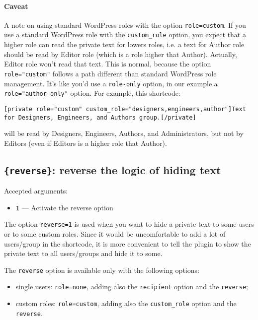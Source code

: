 \paragraph{Caveat}\label{caveat}

A note on using standard WordPress  roles with the option \verb+role=custom+.
If you use a standard WordPress role with the \verb+custom_role+ option, you
expect that a higher role can read the private text for lowers roles, i.e. a
text for Author role should be read by Editor role (which is a role higher that
Author). Actually, Editor role won't read that text. This is normal, because the
option \verb+role="custom"+ follows a path different than standard WordPress
role management. It's like you'd use a \verb+role-only+ option, in our example a
\verb+role="author-only"+ option. For example, this shortcode:

\begin{lstlisting}
[private role="custom" custom_role="designers,engineers,author"]Text for Designers, Engineers, and Authors group.[/private]
\end{lstlisting}

will be read by Designers, Engineers, Authors, and Administrators, but not by
Editors (even if Editors is a higher role that Author).

\subsection{\texttt{\{reverse\}}: reverse the logic of hiding text}

Accepted arguments:

\begin{itemize}
 \item \verb+1+ --- Activate the reverse option
\end{itemize}

The option \verb+reverse=1+ is used when you want to hide a private text to some
users or to some custom roles. Since it would be uncomfortable to add a lot of
users/group in the shortcode, it is more convenient to tell the plugin to show
the private text to all users/groups and hide it to some.

The \verb+reverse+ option is available only with the following options:

\begin{itemize}
 \item single users: \verb+role=none+, adding also the \verb+recipient+ option
 and the \verb+reverse+;
 \item custom roles: \verb+role=custom+, adding also the \verb+custom_role+
 option and the \verb+reverse+.
\end{itemize}

